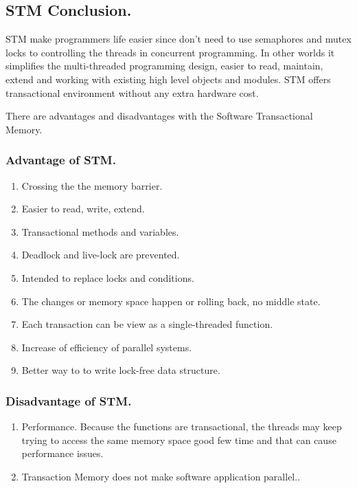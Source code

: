 \documentclass[12pt]{article}
\begin{document}
\subsection{STM Conclusion.}
STM make programmers life easier since don't need to use semaphores and mutex locks to controlling the threads in concurrent programming. In other worlds it simplifies the multi-threaded programming design, easier to read, maintain, extend and working with existing high level objects and modules. STM offers transactional environment without any extra hardware cost. \\

{\setlength{\parindent}{0cm}
There are advantages and disadvantages with the Software Transactional Memory.
\subsubsection{Advantage of STM.}
\begin{enumerate}
\item Crossing the the memory barrier.
\item Easier to read, write, extend.
\item Transactional methods and variables.
\item Deadlock and live-lock are prevented.
\item Intended to replace locks and conditions.
\item The changes or memory space happen or rolling back, no middle state.
\item Each transaction can be view as a single-threaded function.
\item Increase of efficiency of parallel systems.
\item Better way to to write lock-free data structure.
\end{enumerate}
\subsubsection{Disadvantage of STM.}
\begin{enumerate}
\item Performance. Because the functions are transactional, the threads may keep trying to access the same memory space good few time and that can cause performance issues.
\item Transaction Memory does not make software application parallel..
\end{enumerate}

}

\clearpage
\end{document}
